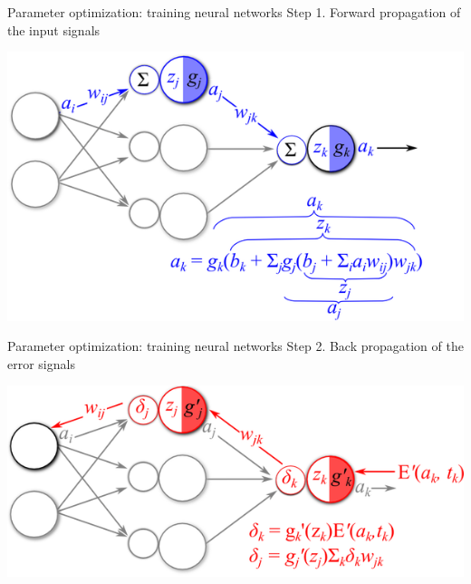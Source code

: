 \documentclass[compress]{beamer}
\begin{document}
\begin{frame}{Parameter optimization: training neural networks}
  Step 1. Forward propagation of the input signals
  \begin{center}
    \includegraphics[width=1.00\textwidth]{./figures/backprop_1.png}
  \end{center}
\end{frame}

\begin{frame}{Parameter optimization: training neural networks}
  Step 2. Back propagation of the error signals
  \begin{center}
    \includegraphics[width=1.00\textwidth]{./figures/backprop_2.png}
  \end{center}
\end{frame}
\end{document}

